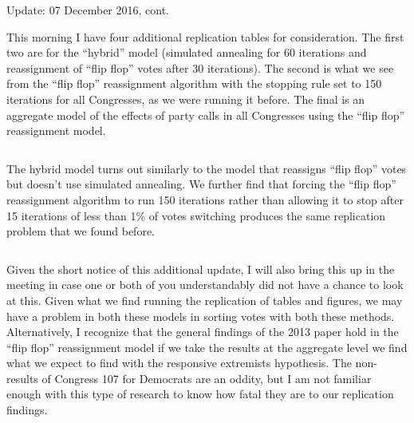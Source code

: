 \documentclass[12pt]{article}
\begin{document}
	
	\begin{center}
		Update: 07 December 2016, cont.
	\end{center}

This morning I have four additional replication tables for consideration. The first two are for the ``hybrid'' model (simulated annealing for 60 iterations and reassignment of ``flip flop'' votes after 30 iterations). The second is what we see from the ``flip flop'' reassignment algorithm with the stopping rule set to 150 iterations for all Congresses, as we were running it before. The final is an aggregate model of the effects of party calls in all Congresses using the ``flip flop'' reassignment model.

$ $

The hybrid model turns out similarly to the model that reassigns ``flip flop'' votes but doesn't use simulated annealing. We further find that forcing the ``flip flop'' reassignment algorithm to run 150 iterations rather than allowing it to stop after 15 iterations of less than 1\% of votes switching produces the same replication problem that we found before.

$ $

Given the short notice of this additional update, I will also bring this up in the meeting in case one or both of you understandably did not have a chance to look at this. Given what we find running the replication of tables and figures, we may have a problem in both these models in sorting votes with both these methods. Alternatively, I recognize that the general findings of the 2013 paper hold in the ``flip flop'' reassignment model if we take the results at the aggregate level we find what we expect to find with the responsive extremists hypothesis. The non-results of Congress 107 for Democrats are an oddity, but I am not familiar enough with this type of research to know how fatal they are to our replication findings.
	
\end{document}
